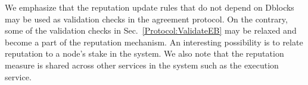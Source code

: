 We emphasize that the reputation update rules that do not depend on Dblocks may be used as validation checks in the agreement protocol. On the contrary, some of the validation checks in Sec.~\ref{Protocol:ValidateEB} may be relaxed and become a part of the reputation mechanism. %
An interesting possibility is to relate reputation to a node's stake in the system. We also note that the reputation measure is shared across other services in the system such as the execution service.

